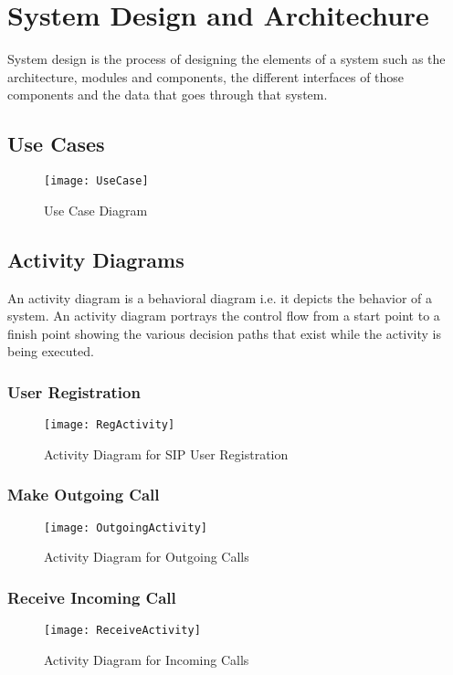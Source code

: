 \chapter{System Design and Architechure}
System design is the process of designing the elements of a system such as the architecture, modules and components, the different interfaces of those components and the data that goes through that system.

\section{Use Cases}
\begin{figure}[H]
    \centering
    \texttt{[image: UseCase]}
    \caption{Use Case Diagram}
    \label{fig:use_case}
\end{figure}

\section{Activity Diagrams}
An activity diagram is a behavioral diagram i.e. it depicts the behavior of a system. An activity diagram portrays the control flow from a start point to a finish point showing the various decision paths that exist while the activity is being executed.

\subsection{User Registration}
\begin{figure}[H]
    \centering
    \texttt{[image: RegActivity]}
    \caption{Activity Diagram for SIP User Registration}
    \label{fig:reg_activity}
\end{figure}

\subsection{Make Outgoing Call}
\begin{figure}[H]
    \centering
    \texttt{[image: OutgoingActivity]}
    \caption{Activity Diagram for Outgoing Calls}
    \label{fig:out_activity}
\end{figure}

\subsection{Receive Incoming Call}
\begin{figure}[H]
    \centering
    \texttt{[image: ReceiveActivity]}
    \caption{Activity Diagram for Incoming Calls}
    \label{fig:recv_activity}
\end{figure}

